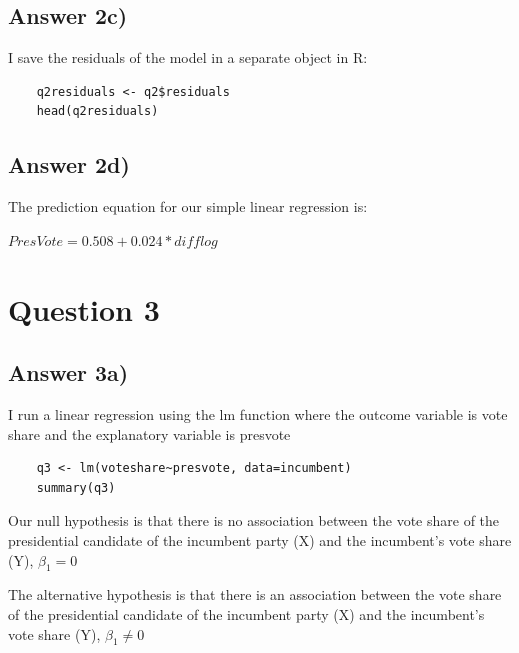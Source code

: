 \documentclass{article}
\begin{document}
\subsection{Answer 2c)}
I save the residuals of the model in a separate object in R:
\begin{verbatim}
    q2residuals <- q2$residuals
    head(q2residuals)
\end{verbatim}
\subsection{Answer 2d)}
The prediction equation for our simple linear regression is:

\begin{math}
    Pres Vote = 0.508 + 0.024 * difflog 
\end{math}
\section{Question 3}

\subsection{Answer 3a)}
I run a linear regression using the lm function where the outcome variable is vote share and the explanatory variable is presvote
\begin{verbatim}
    q3 <- lm(voteshare~presvote, data=incumbent)
    summary(q3)
\end{verbatim}

Our null hypothesis is that there is no association between the vote share of the presidential candidate of the incumbent party (X) and the incumbent's vote share (Y), $\beta_1 = 0$

The alternative hypothesis is that there is an association between the vote share of the presidential candidate of the incumbent party (X) and the incumbent's vote share (Y), $\beta_1 \neq 0$
\end{document}
